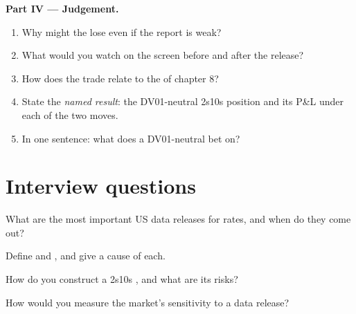 \begin{problem}
\medskip\noindent\textbf{Part IV --- Judgement.}
\begin{enumerate}[resume]
\item Why might the  lose even if the report is weak?
\item What would you watch on the screen before and after the release?
\item How does the trade relate to the  of chapter 8?
\item State the \emph{named result}: the DV01-neutral 2s10s position and its P\&L under
each of the two moves.
\item In one sentence: what does a DV01-neutral  bet on?
\end{enumerate}
\end{problem}

\section{Interview questions}

\begin{interviewq}\label{iq:m2:reading-a-macro-calendar-and-a-rates-screen:1}
What are the most important US data releases for rates, and when do they come out?
\end{interviewq}

\begin{interviewq}\label{iq:m2:reading-a-macro-calendar-and-a-rates-screen:2}
Define  and , and give a cause of each.
\end{interviewq}

\begin{interviewq}\label{iq:m2:reading-a-macro-calendar-and-a-rates-screen:3}
How do you construct a 2s10s , and what are its risks?
\end{interviewq}

\begin{interviewq}\label{iq:m2:reading-a-macro-calendar-and-a-rates-screen:4}
How would you measure the market's sensitivity to a data release?
\end{interviewq}

